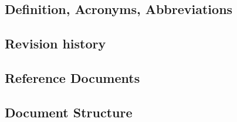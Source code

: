 \subsection{Definition, Acronyms, Abbreviations}
\subsection{Revision history}
\subsection{Reference Documents}
\subsection{Document Structure}
\vfill